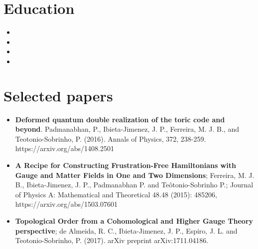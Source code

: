 \documentclass[11pt,a4paper,sans]{moderncv}        %
\begin{document}
\section{Education}

\vspace{3pt}

\begin{itemize}

\item{}  %

\vspace{1pt}

\item{}

\vspace{1pt}

\item{}

\vspace{1pt}


\item{}  %


\end{itemize}
\section{Selected papers}

\vspace{3pt}

\begin{itemize}
\item \textbf{Deformed quantum double realization of the toric code and beyond}. Padmanabhan, P., Ibieta-Jimenez, J. P., Ferreira, M. J. B., and Teotonio-Sobrinho, P. (2016). Annals of Physics, 372, 238-259. https://arxiv.org/abs/1408.2501
\vspace{1pt}
\item \textbf{A Recipe for Constructing Frustration-Free Hamiltonians with Gauge and Matter Fields in One and Two Dimensions}; Ferreira, M. J. B., Ibieta-Jimenez, J. P., Padmanabhan P.  and  Teôtonio-Sobrinho P.; Journal of Physics A: Mathematical and Theoretical 48.48 (2015): 485206, https://arxiv.org/abs/1503.07601
\vspace{1pt}
\item \textbf{Topological Order from a Cohomological and Higher Gauge Theory perspective}; de Almeida, R. C., Ibieta-Jimenez, J. P., Espiro, J. L. and Teotonio-Sobrinho, P. (2017). arXiv preprint arXiv:1711.04186.
\end{itemize}
\end{document}
